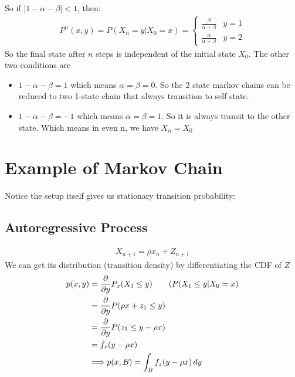 So if $|1-\alpha-\beta| < 1$, then: 
    \begin{align*}
        P^n(x,y) = P(X_n = y|X_0 = x) =  \begin{cases} \frac{\beta}{\alpha+\beta} & y=1 \\ \frac{\alpha}{\alpha+\beta} & y = 2\end{cases}
    \end{align*}
So the final state after $n$ steps is independent of the initial state $X_0$. The other two conditions are 
    \begin{itemize}
        \item $1-\alpha-\beta = 1$ which means $\alpha = \beta = 0 $. So the 2 state markov chains can be reduced to two 1-state chain that always transition to self state. 
        \item $1 - \alpha - \beta = -1$ which means $\alpha = \beta = 1$. So it is always transit to the other state. Which means in even n, we have $X_n = X_0$
    \end{itemize}



\section{Example of Markov Chain} 
Notice the setup itself gives us stationary transition probability: 

\subsection{Autoregressive Process} 
    \begin{align*}
        X_{n+1} = \rho x_n + Z_{n+1}
    \end{align*}
We can get its distribution (transition density) by differentiating the CDF of $Z$
    \begin{align*}
        p(x,y) 
        & = \frac{\partial}{\partial y} P_x( X_1 \leq y) \tag{$P(X_1 \leq y |X_0 = x$} \\
        & = \frac{\partial}{\partial y} P(\rho x + z_1 \leq y ) \\
        & = \frac{\partial}{\partial y} P(z_1 \leq y - \rho x) \\
        & = f_z(y-\rho x) \\
        & \Longrightarrow p(x, B) = \int_B f_z(y-\rho x) \, dy
    \end{align*}


